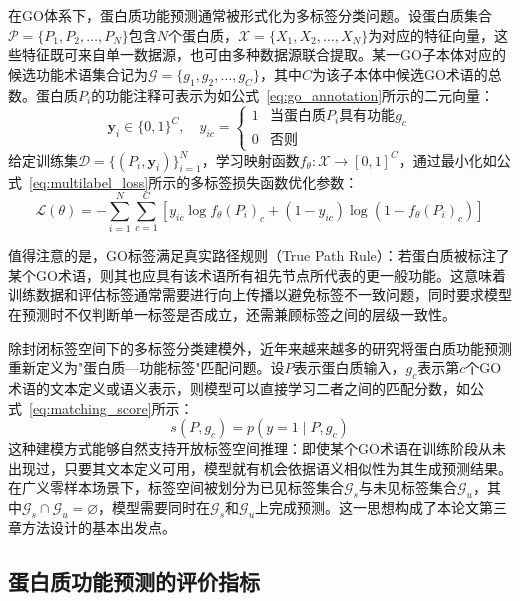 在GO体系下，蛋白质功能预测通常被形式化为多标签分类问题。设蛋白质集合$\mathcal{P}=\{P_1,P_2,\ldots,P_N\}$包含$N$个蛋白质，$\mathcal{X} = \{X_1, X_2, \ldots, X_N\}$为对应的特征向量，这些特征既可来自单一数据源，也可由多种数据源联合提取。某一GO子本体对应的候选功能术语集合记为$\mathcal{G} = \{g_1, g_2, \ldots, g_C\}$，其中$C$为该子本体中候选GO术语的总数。蛋白质$P_i$的功能注释可表示为如公式~\eqref{eq:go_annotation}所示的二元向量：
\begin{equation}
\label{eq:go_annotation}
\mathbf{y}_i \in \{0,1\}^C, \quad y_{ic} =
\begin{cases}
1 & \text{当蛋白质}P_i\text{具有功能}g_c \\
0 & \text{否则}
\end{cases}
\end{equation}
给定训练集$\mathcal{D} = \{(P_i, \mathbf{y}_i)\}_{i=1}^{N}$，学习映射函数$f_\theta: \mathcal{X} \to [0,1]^C$，通过最小化如公式~\eqref{eq:multilabel_loss}所示的多标签损失函数优化参数：
\begin{equation}
\label{eq:multilabel_loss}
\mathcal{L}(\theta) = -\sum_{i=1}^{N}\sum_{c=1}^{C}\left[y_{ic}\log f_\theta(P_i)_c + (1-y_{ic})\log(1-f_\theta(P_i)_c)\right]
\end{equation}

值得注意的是，GO标签满足真实路径规则（True Path Rule）：若蛋白质被标注了某个GO术语，则其也应具有该术语所有祖先节点所代表的更一般功能。这意味着训练数据和评估标签通常需要进行向上传播以避免标签不一致问题，同时要求模型在预测时不仅判断单一标签是否成立，还需兼顾标签之间的层级一致性。

除封闭标签空间下的多标签分类建模外，近年来越来越多的研究将蛋白质功能预测重新定义为"蛋白质—功能标签"匹配问题。设$P$表示蛋白质输入，$g_c$表示第$c$个GO术语的文本定义或语义表示，则模型可以直接学习二者之间的匹配分数，如公式~\eqref{eq:matching_score}所示：
\begin{equation}
\label{eq:matching_score}
s(P, g_c) = p(y=1 \mid P, g_c)
\end{equation}
这种建模方式能够自然支持开放标签空间推理：即使某个GO术语在训练阶段从未出现过，只要其文本定义可用，模型就有机会依据语义相似性为其生成预测结果。在广义零样本场景下，标签空间被划分为已见标签集合$\mathcal{G}_s$与未见标签集合$\mathcal{G}_u$，其中$\mathcal{G}_s \cap \mathcal{G}_u = \varnothing$，模型需要同时在$\mathcal{G}_s$和$\mathcal{G}_u$上完成预测。这一思想构成了本论文第三章方法设计的基本出发点。

\subsection{蛋白质功能预测的评价指标}

